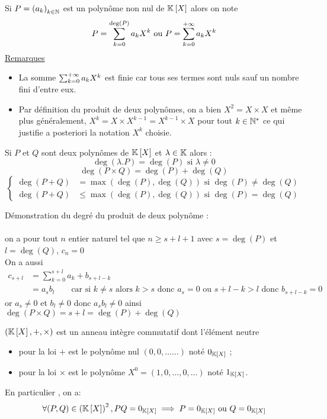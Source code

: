 \begin{defprop}
    Si \(P = \left(a_k\right)_{k\in \mathbb{N}}\) est un polynôme non nul de \(\mathbb{K} \left[X\right]\) alors on note
    \[P =\sum^{\deg(P )}_{k=0} a_k X^k\text{ ou }P =\sum^{+\infty}_{k=0} a_k X^k \]
    \underline{Remarques}
    \begin{itemize}
        \item La somme \(\sum^{+\infty}_{k=0} a_k X^k\) est finie car tous ses termes sont nuls sauf un nombre fini d’entre eux.
        \item Par définition du produit de deux polynômes, on a bien \(X^2 = X \times X\) et même plus généralement, \(X^k = X \times X^{k-1} = X^{k-1} \times X\) pour tout \(k \in \mathbb{N}^*\) ce qui justifie a posteriori la notation \(X^k\) choisie.
    \end{itemize}
\end{defprop}

\begin{defprop}
    Si \(P\) et \(Q\) sont deux polynômes de \(\mathbb{K} \left[X\right]\) et \(\lambda \in \mathbb{K}\) alors :
    \[ \deg(\lambda.P) = \deg(P) \text{ si } \lambda \neq 0\]
    \[ \deg(P \times Q) = \deg(P) + \deg(Q)\]
    \[\begin{cases}
        \deg(P+Q) &= \max (\deg(P),\deg(Q)) \text{ si } \deg(P) \neq \deg(Q) \\
        \deg(P+Q)& \leq \max (\deg(P),\deg(Q)) \text{ si } \deg(P) = \deg(Q)
    \end{cases}\]
\end{defprop}
\begin{dem}
    Démonstration du degré du produit de deux polynôme :\\~\\
    on a pour tout \(n\) entier naturel tel que \( n \geq s + l + 1\) avec \(s = \deg(P)\) et \(l = \deg (Q)\), \(c_n = 0\)\\
    On a aussi \begin{align*}
        c_{s+l} &= \sum_{k = 0}^{s+l} a_k + b_{s+l-k} \\
        &= a_s b_l \qquad \text{car si } k \neq s \text{ alors } k > s \text{ donc } a_s = 0 \text{ ou } s+l-k > l \text{ donc } b_{s+l-k} = 0
    \end{align*}
    or \(a_s \neq 0\) et \(b_l \neq 0\) donc \(a_s b_l \neq 0 \) ainsi \(\deg(P \times Q) = s+l = \deg(P) + \deg(Q)\)
\end{dem}
\begin{defprop}
    \(\left(\mathbb{K} \left[X\right] , +, \times\right)\) est un anneau intègre commutatif dont l’élément neutre
    \begin{itemize}
        \item pour la loi \(+\) est le polynôme nul \((0, 0, \dots \dots )\) noté \(0_{\mathbb{K}\left[X\right]}\) ;
        \item pour la loi \(\times\) est le polynôme \(X^0 = (1, 0, \dots , 0, \dots )\) noté \(1_{\mathbb{K}\left[X\right]}\).
    \end{itemize}
    En particulier , on a:
    \[\forall(P,Q) \in \left(\mathbb{K} \left[X\right]\right)^2, PQ = 0_{\mathbb{K}\left[X\right]} \implies P = 0_{\mathbb{K}\left[X\right]} \text{ ou } Q = 0_{\mathbb{K}\left[X\right]}\]
\end{defprop}

